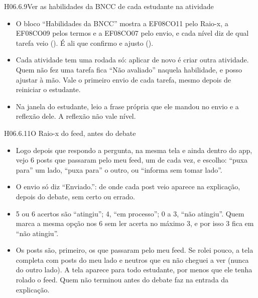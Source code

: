 \begin{historia}{H06.6.9}{Ver as habilidades da BNCC de cada estudante na atividade}{\pronto}
\aceite
\begin{itemize}
  \item O bloco \enquote{Habilidades da BNCC} mostra a EF08CO11 pelo Raio-x,
    a EF08CO09 pelos termos e a
    EF08CO07 pelo envio, e cada nível diz de qual tarefa veio ().
    É ali que confirmo e ajusto ().
  \item Cada atividade tem uma rodada só: aplicar de novo é criar outra
    atividade. Quem não fez uma tarefa fica \enquote{Não avaliado} naquela
    habilidade, e posso ajustar à mão. Vale o primeiro envio de cada tarefa,
    mesmo depois de reiniciar o estudante.
  \item Na janela do estudante, leio a frase própria que ele mandou no envio
    e a reflexão dele. A reflexão não vale nível.
\end{itemize}
\end{historia}

\begin{historia}{H06.6.11}{O Raio-x do feed, antes do debate}{\pronto}
\aceite
\begin{itemize}
  \item Logo depois que respondo a pergunta, na mesma tela e ainda dentro do
    app, vejo 6 posts que passaram pelo meu feed, um de cada vez, e escolho:
    \enquote{puxa para} um lado, \enquote{puxa para} o outro, ou
    \enquote{informa sem tomar lado}.
  \item O envio só diz \enquote{Enviado.}: de onde cada post veio aparece na
    explicação, depois do debate, sem certo ou errado.
  \item 5 ou 6 acertos são \enquote{atingiu}; 4, \enquote{em processo};
    0 a 3, \enquote{não atingiu}. Quem marca a mesma opção nos 6 sem ler
    acerta no máximo 3, e por isso 3 fica em \enquote{não atingiu}.
  \item Os posts são, primeiro, os que passaram pelo meu feed. Se rolei pouco,
    a tela completa com posts do meu lado e neutros que eu não cheguei a ver
    (nunca do outro lado). A tela aparece para todo estudante, por menos que
    ele tenha rolado o feed. Quem não terminou antes do debate faz na entrada
    da explicação.
\end{itemize}
\end{historia}

